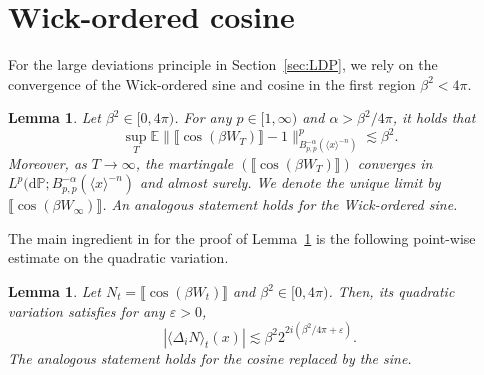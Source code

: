 \documentclass[11pt, a4paper]{scrartcl}
\numberwithin{equation}{section}
\theoremstyle{plain}
\newtheorem{lemma}[foo]{Lemma}
\theoremstyle{remark}
\newcommand{\mathd}{\mathrm{d}}
\newcommand{\nobracket}{}
\begin{document}
\section{Wick-ordered cosine}\label{app:wick-cos}

For the large deviations principle in Section~\ref{sec:LDP}, we rely on the
convergence of the Wick-ordered sine and cosine in the first region $\beta^2 <
	4 \pi$.

\begin{lemma}
	\label{lem:wick-conv}Let $\beta^2 \in [0, 4 \pi)$. For any $p \in [1,
		\infty)$ and $\alpha > \beta^2 / 4 \pi$, it holds that
	\[ \sup_T \mathbb{E} \| \llbracket \cos (\beta W_T) \rrbracket - 1 \|_{B_{p,
						p}^{- \alpha} (\langle x \rangle^{- n})}^p \lesssim \beta^2 . \]
	Moreover, as $T \rightarrow \infty$, the martingale $(\llbracket \cos (\beta
		W_T) \rrbracket)$ converges in $L^p (\mathd \mathbb{P} ; B_{p, p}^{- \alpha} (\langle
		x \rangle^{- n}) \nobracket$ and almost surely. We denote the unique limit
	by $\llbracket \cos (\beta W_{\infty}) \rrbracket$. An analogous statement
	holds for the Wick-ordered sine.
\end{lemma}

The main ingredient in for the proof of Lemma~\ref{lem:wick-conv} is the
following point-wise estimate on the quadratic variation.

\begin{lemma}
	\label{lem:variation-bound}Let $N_t = \llbracket \cos (\beta W_t)
		\rrbracket$ and $\beta^2 \in [0, 4 \pi)$. Then, its quadratic variation
	satisfies for any $\varepsilon > 0$,
	\[ | \langle \Delta_i N \rangle_t (x) | \lesssim \beta^2 2^{2 i (\beta^2 / 4
				\pi + \varepsilon)} . \]
	The analogous statement holds for the cosine replaced by the sine.
\end{lemma}
\end{document}

